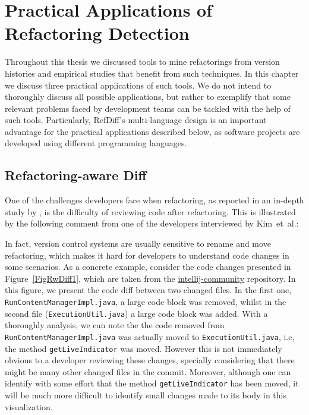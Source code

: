 \chapter{Practical Applications of Refactoring Detection}
\label{ChPracticalApplications}

Throughout this thesis we discussed tools to mine refactorings from version histories and empirical studies that benefit from such techniques. In this chapter we discuss three practical applications of such tools.
We do not intend to thoroughly discuss all possible applications, but rather to exemplify that some relevant problems faced by development teams can be tackled with the help of such tools.
Particularly, RefDiff's multi-language design is an important advantage for the practical applications described below, as software projects are developed using different programming languages.


\section{Refactoring-aware Diff}
\label{SecRefactoringDiff}


One of the challenges developers face when refactoring, as reported in an in-depth study by \cite{kim-tse-2014}, is the difficulty of reviewing code after refactoring.
This is illustrated by the following comment from one of the developers interviewed by Kim~et~al.:\margin

\margin

In fact, version control systems are usually sensitive to rename and move refactoring,
which makes it hard for developers to understand code changes in some scenarios. 
As a concrete example, consider the code changes presented in Figure~\ref{FigRwDiff1}, which are taken from the \url{intellij-community} repository. In this figure, we present the code diff between two changed files. In the first one, \texttt{RunContentManagerImpl.java}, a large code block was removed, whilst in the second file (\texttt{ExecutionUtil.java}) a large code block was added. With a thoroughly analysis, we can note the the code removed from \texttt{RunContentManagerImpl.java} was actually moved to \texttt{ExecutionUtil.java}, i.e, the method \texttt{getLiveIndicator} was moved.
However this is not immediately obvious to a developer reviewing these changes, specially considering that there might be many other changed files in the commit. Moreover, although one can identify with some effort that the method \texttt{getLiveIndicator} has been moved, it will be much more difficult to identify small changes made to its body in this visualization.


